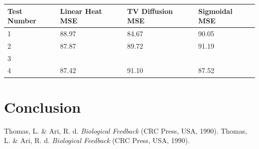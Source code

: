 \documentclass{article}
\begin{document}
  \newpage
  \begin{table}[]
    \begin{tabular}{|l|l|ll|lllll|}
    \hline
    Test Number & Linear Heat MSE & \multicolumn{2}{l|}{TV Diffusion MSE} & \multicolumn{5}{l|}{Sigmoidal MSE}  \\ \hline
    1           &  88.97          & \multicolumn{2}{l|}{84.67}            & \multicolumn{5}{l|}{90.05}          \\ \hline
    2           &  87.87          & \multicolumn{2}{l|}{89.72}            & \multicolumn{5}{l|}{91.19}          \\ \hline
    3           &                 & \multicolumn{2}{l|}{}                 & \multicolumn{5}{l|}{}               \\ \hline
    4           &  87.42          & \multicolumn{2}{l|}{91.10}            & \multicolumn{5}{l|}{87.52}          \\ \hline
    \end{tabular}
    \end{table}


  \newpage
  \section{Conclusion}


  \begin{thebibliography}{unsrt}
      Thomas, L. \& Ari, R. d. \emph{Biological Feedback} (CRC Press, USA, 1990).
      Thomas, L. \& Ari, R. d. \emph{Biological Feedback} (CRC Press, USA, 1990).
  \end{thebibliography}
\end{document}
